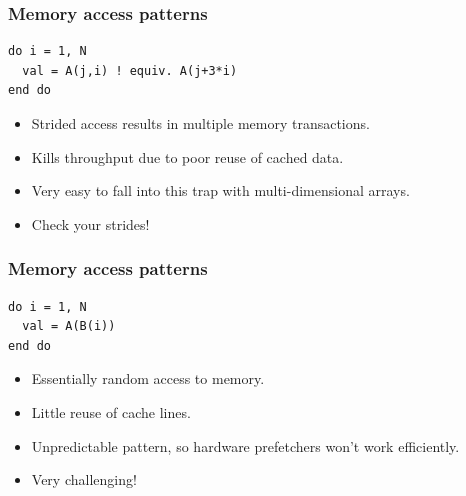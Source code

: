 \documentclass{beamer}
\begin{document}
\begin{frame}[fragile]
\frametitle{Memory access patterns}
\begin{verbatim}
do i = 1, N
  val = A(j,i) ! equiv. A(j+3*i)
end do
\end{verbatim}
\begin{adjustbox}{max width={\textwidth}}
\end{adjustbox}
\begin{itemize}
  \item Strided access results in multiple memory transactions.
  \item Kills throughput due to poor reuse of cached data.
  \item Very easy to fall into this trap with multi-dimensional arrays.
  \item Check your strides!
\end{itemize}
\end{frame}

\begin{frame}[fragile]
\frametitle{Memory access patterns}
\begin{verbatim}
do i = 1, N
  val = A(B(i))
end do
\end{verbatim}
\begin{adjustbox}{max width={\textwidth}}
\end{adjustbox}
\begin{itemize}
  \item Essentially random access to memory.
  \item Little reuse of cache lines.
  \item Unpredictable pattern, so hardware prefetchers won't work efficiently.
  \item Very challenging!
\end{itemize}
\end{frame}
\end{document}
